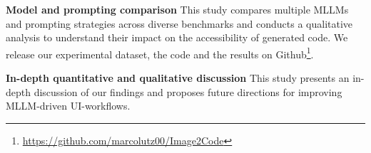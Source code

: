 \textbf{Model and prompting comparison}
This study compares multiple MLLMs and prompting strategies across diverse benchmarks and
conducts a qualitative analysis to understand their impact on the accessibility of generated code.
We release our experimental dataset, the code and the results on 
Github\footnote{\url{https://github.com/marcolutz00/Image2Code}}.\newline

\textbf{In-depth quantitative and qualitative discussion}
This study presents an in-depth discussion of our findings and proposes 
future directions for improving MLLM-driven UI-workflows.






